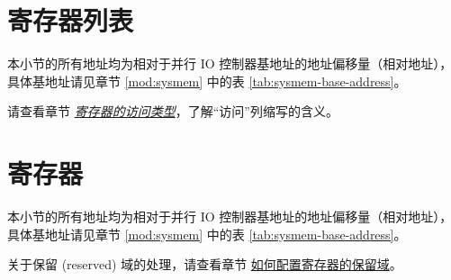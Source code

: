 \documentclass[main\_\_CN.tex]{subfiles}
\begin{document}
\newpage
\hypertarget{parlio-reg-summ}{}
\section{寄存器列表}
\label{sec:parlio-reg-summ}


本小节的所有地址均为相对于并行 IO 控制器基地址的地址偏移量（相对地址），具体基地址请见章节 \ref{mod:sysmem} \textit{} 中的表 \ref{tab:sysmem-base-address}。

请查看章节 \hyperref[glossary-access-types]{\textit{寄存器的访问类型}}，了解“访问”列缩写的含义。






\newpage
\section{寄存器}

本小节的所有地址均为相对于并行 IO 控制器基地址的地址偏移量（相对地址），具体基地址请见章节 \ref{mod:sysmem} \textit{} 中的表 \ref{tab:sysmem-base-address}。

关于保留 (reserved) 域的处理，请查看章节 \hyperref[programming-reserved-field]{如何配置寄存器的保留域}。


\end{document}
